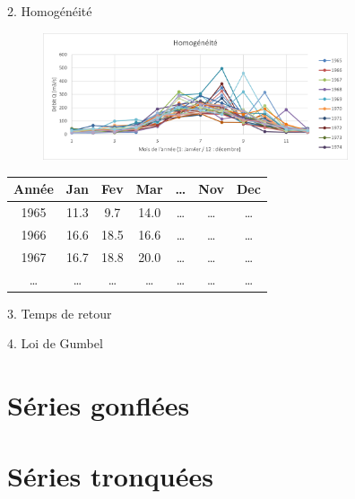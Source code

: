 \documentclass{beamer}
\begin{document}
\begin{frame}{2. Homogénéité}
    \begin{figure}
        \centering
        \includegraphics[width=9cm]{homogeneite.png}
    \end{figure}
    \begin{table}
        \centering
        \begin{tabular}{c|c|c|c|c|c|c}
            \toprule
            \textbf{Année} & \textbf{Jan} & \textbf{Fev} & \textbf{Mar} & \textbf{\dots} & \textbf{Nov} & \textbf{Dec} \\
            \midrule
            1965  & 11.3  &  9.7  & 14.0  & \dots & \dots & \dots \\
            1966  & 16.6  & 18.5  & 16.6  & \dots & \dots & \dots \\ 
            1967  & 16.7  & 18.8  & 20.0  & \dots & \dots & \dots \\
            \dots & \dots & \dots & \dots & \dots & \dots & \dots \\
            \bottomrule
        \end{tabular} 
    \end{table}
\end{frame}

\begin{frame}{3. Temps de retour}
\end{frame}

\begin{frame}{4. Loi de Gumbel}
\end{frame}

\section{Séries gonflées}

\section{Séries tronquées}
\end{document}
